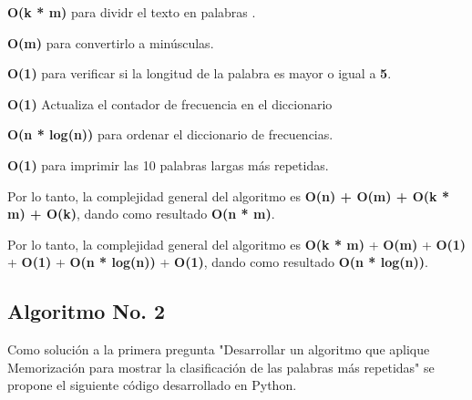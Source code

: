 \documentclass[journal, spanish]{IEEEtran}
\begin{document}
\textbf{O(k * m)} para dividr el texto en palabras .

\textbf{O(m)} para convertirlo a minúsculas.

\textbf{O(1)} para verificar si la longitud de la palabra es mayor o igual a \textbf{5}.

\textbf{O(1)} Actualiza el contador de frecuencia en el diccionario

\textbf{O(n * log(n))} para ordenar el diccionario de frecuencias.

\textbf{O(1)} para imprimir las 10 palabras largas más repetidas.

Por lo tanto, la complejidad general del algoritmo es \textbf{O(n) + O(m) + O(k * m) + O(k)}, dando como resultado \textbf{O(n * m)}.

Por lo tanto, la complejidad general del algoritmo es \textbf{O(k * m)} + \textbf{O(m)} + \textbf{O(1)} + \textbf{O(1)} + \textbf{O(n * log(n))} + \textbf{O(1)}, dando como resultado \textbf{O(n * log(n))}.

\subsection{Algoritmo No. 2}

Como solución a la primera pregunta "Desarrollar un algoritmo que aplique Memorización para mostrar la clasificación de las palabras más repetidas" se propone el siguiente código desarrollado en Python.
\end{document}
